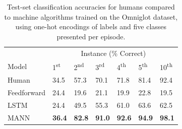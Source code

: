 \documentclass{article}
\begin{document}
\begin{table}[t]
\caption{Test-set classification accuracies for humans compared to machine algorithms trained on the Omniglot dataset, using one-hot encodings of labels and five classes presented per episode.}
\label{omniglot-test--1hot-table}
\vskip 0.15in
\begin{center}
\begin{small}
\begin{sc}
\begin{tabular}{l|p{5mm}p{5mm}p{5mm}p{5mm}p{5mm}p{5mm}}
\hline
& \multicolumn{6}{c}{Instance (\% Correct)} \\
Model & 1\textsuperscript{st} & 2\textsuperscript{nd} & 3\textsuperscript{rd} & 4\textsuperscript{th} & 5\textsuperscript{th} & 10\textsuperscript{th} \\
\hline
\abovespace
Human       & 34.5  & 57.3  & 70.1  & 71.8  & 81.4  & 92.4  \\
Feedforward & 24.4  & 19.6  & 21.1  & 19.9  & 22.8  & 19.5  \\
LSTM        & 24.4  & 49.5  & 55.3  & 61.0  & 63.6  & 62.5  \\
MANN         & \textbf{36.4}  & \textbf{82.8}  & \textbf{91.0}  & \textbf{92.6}  & \textbf{94.9}  & \textbf{98.1}  \\
\hline
\end{tabular}
\end{sc}
\end{small}
\end{center}
\vskip -0.1in
\end{table}


\end{document}
